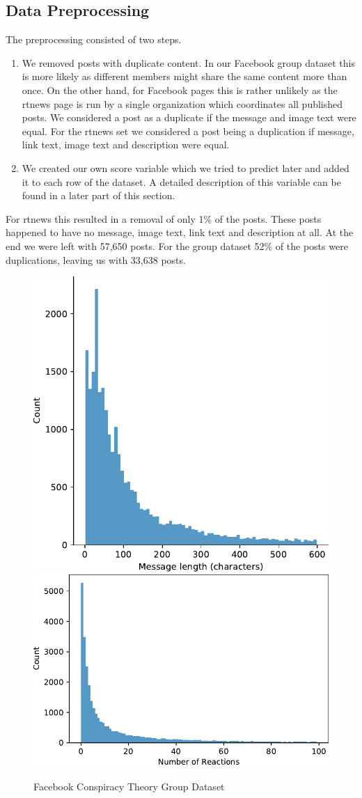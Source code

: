 \subsection{Data Preprocessing} The preprocessing consisted of two steps. 
\begin{enumerate} 
    \item We removed posts with duplicate content. In our Facebook group dataset this is
more likely  as different members might share the same content more than once. On the other
hand, for
Facebook pages  this is rather unlikely as the rtnews page is run by a single
organization which coordinates all published posts. We considered a post as a duplicate
if the message and image text were equal. For the rtnews set we considered a post
being a duplication if message, link text, image text and description were equal. 
    \item We created our own score variable which we tried to predict later and added it to
each row of the dataset. A detailed description of this variable can be found in a  later
part of this section. 
\end{enumerate}
For rtnews this resulted in a removal of only 1\% of the posts. These posts happened to
have no message,  image text, link text and description at all. At the end we were left
with 57,650 posts. For the group dataset 52\% of the posts were duplications, leaving us
with 33,638 posts. 
\begin{figure}[tb] 
    \centering
    \includegraphics[width=.32\textwidth]{figures/dataset_groups/message_length_dist.pdf}
    \includegraphics[width=.32\textwidth]{figures/dataset_groups/reactions_dist.pdf}
    \caption{Facebook Conspiracy Theory Group Dataset}
    \label{fig:datasetstats-groups}
\end{figure} 
